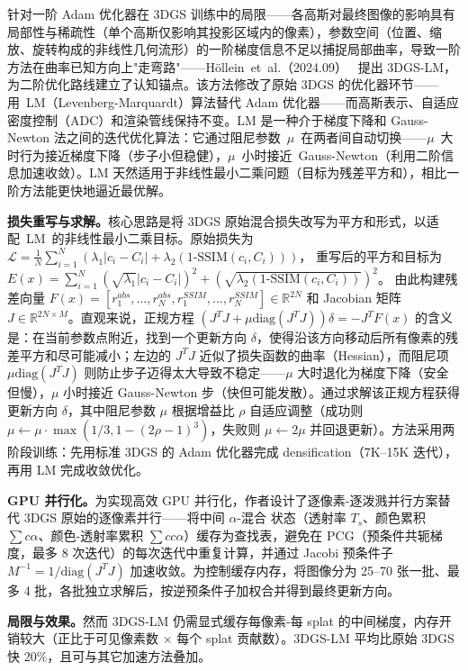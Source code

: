 针对一阶 Adam 优化器在 3DGS 训练中的局限——各高斯对最终图像的影响具有局部性与稀疏性（单个高斯仅影响其投影区域内的像素），参数空间（位置、缩放、旋转构成的非线性几何流形）的一阶梯度信息不足以捕捉局部曲率，导致一阶方法在曲率已知方向上"走弯路"——H\"ollein~et~al.（2024.09）~\cite{2409_12892} 提出 3DGS-LM，为二阶优化路线建立了认知锚点。该方法修改了原始 3DGS 的优化器环节——用~LM（Levenberg-Marquardt）算法替代 Adam 优化器——而高斯表示、自适应密度控制（ADC）和渲染管线保持不变。LM 是一种介于梯度下降和 Gauss-Newton 法之间的迭代优化算法：它通过阻尼参数~$\mu$~在两者间自动切换——$\mu$~大时行为接近梯度下降（步子小但稳健），$\mu$~小时接近~Gauss-Newton（利用二阶信息加速收敛）。LM 天然适用于非线性最小二乘问题（目标为残差平方和），相比一阶方法能更快地逼近最优解。

\textbf{损失重写与求解。}核心思路是将 3DGS 原始混合损失改写为平方和形式，以适配~LM~的非线性最小二乘目标。原始损失为
$\mathcal{L} = \frac{1}{N}\sum_{i=1}^{N}(\lambda_1|c_i - C_i| + \lambda_2(1\text{-SSIM}(c_i, C_i)))$，
重写后的平方和目标为
$E(x) = \sum_{i=1}^{N}(\sqrt{\lambda_1}|c_i - C_i|)^2 + (\sqrt{\lambda_2(1\text{-SSIM}(c_i, C_i))})^2$。
由此构建残差向量 $F(x) = [r^{abs}_1, \ldots, r^{abs}_N, r^{SSIM}_1, \ldots, r^{SSIM}_N] \in \mathbb{R}^{2N}$ 和 Jacobian 矩阵 $J \in \mathbb{R}^{2N \times M}$。直观来说，正规方程 $(J^TJ + \mu \text{diag}(J^TJ))\delta = -J^TF(x)$ 的含义是：在当前参数点附近，找到一个更新方向 $\delta$，使得沿该方向移动后所有像素的残差平方和尽可能减小；左边的 $J^TJ$ 近似了损失函数的曲率（Hessian），而阻尼项 $\mu \text{diag}(J^TJ)$ 则防止步子迈得太大导致不稳定——$\mu$ 大时退化为梯度下降（安全但慢），$\mu$ 小时接近 Gauss-Newton 步（快但可能发散）。通过求解该正规方程获得更新方向 $\delta$，其中阻尼参数 $\mu$ 根据增益比 $\rho$ 自适应调整（成功则 $\mu \leftarrow \mu \cdot \max(1/3, 1-(2\rho-1)^3)$，失败则 $\mu \leftarrow 2\mu$ 并回退更新）。方法采用两阶段训练：先用标准 3DGS 的 Adam 优化器完成 densification（7K--15K 迭代），再用 LM 完成收敛优化。

\textbf{GPU 并行化。}为实现高效 GPU 并行化，作者设计了逐像素-逐泼溅并行方案替代 3DGS 原始的逐像素并行——将中间 $\alpha$-混合 状态（透射率 $T_s$、颜色累积 $\sum c \alpha$、颜色-透射率累积 $\sum c c \alpha$）缓存为查找表，避免在 PCG（预条件共轭梯度，最多 8 次迭代）的每次迭代中重复计算，并通过 Jacobi 预条件子 $M^{-1} = 1/\text{diag}(J^TJ)$ 加速收敛。为控制缓存内存，将图像分为 25--70 张一批、最多 4 批，各批独立求解后，按逆预条件子加权合并得到最终更新方向。

\textbf{局限与效果。}然而 3DGS-LM 仍需显式缓存每像素-每 splat 的中间梯度，内存开销较大（正比于可见像素数 $\times$ 每个 splat 贡献数）。3DGS-LM 平均比原始 3DGS 快 20\%，且可与其它加速方法叠加。

